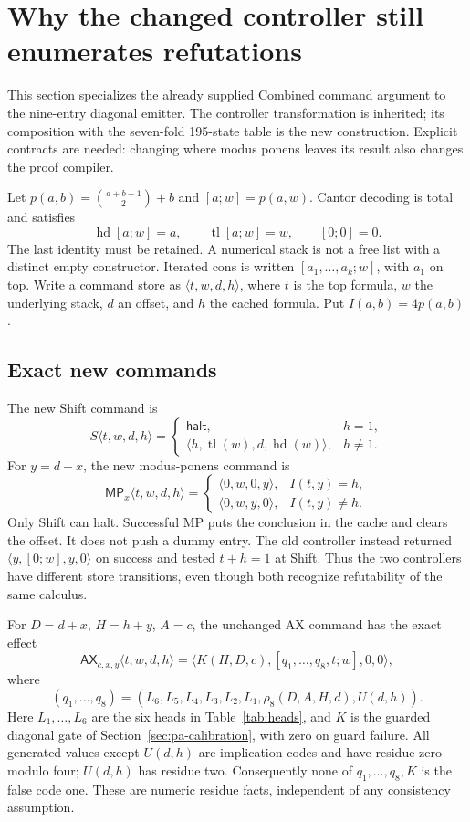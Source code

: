 \section{Why the changed controller still enumerates refutations}
\label{sec:commands}

This section specializes the already supplied Combined command argument
\cite{combined,cross,new195} to the nine-entry diagonal emitter. The
controller transformation is inherited; its composition with the seven-fold
195-state table is the new construction. Explicit contracts are needed:
changing where modus ponens leaves its result also changes the proof compiler.

Let $p(a,b)=\binom{a+b+1}{2}+b$ and $[a;w]=p(a,w)$. Cantor decoding is
total and satisfies
\[
 \operatorname{hd}[a;w]=a,\qquad
 \operatorname{tl}[a;w]=w,\qquad [0;0]=0.
\]
The last identity must be retained. A numerical stack is not a free list
with a distinct empty constructor. Iterated cons is written
$[a_1,\ldots,a_k;w]$, with $a_1$ on top. Write a command store as
$\langle t,w,d,h\rangle$, where $t$ is the top formula, $w$ the underlying
stack, $d$ an offset, and $h$ the cached formula. Put $I(a,b)=4p(a,b)$.

\subsection{Exact new commands}

The new Shift command is
\[
 S\langle t,w,d,h\rangle=
 \begin{cases}
  \mathsf{halt},&h=1,\\
  \langle h,\operatorname{tl}(w),d,\operatorname{hd}(w)\rangle,&h\ne1.
 \end{cases}
\]
For $y=d+x$, the new modus-ponens command is
\[
 \mathsf{MP}_x\langle t,w,d,h\rangle=
 \begin{cases}
  \langle0,w,0,y\rangle,&I(t,y)=h,\\
  \langle0,w,y,0\rangle,&I(t,y)\ne h.
 \end{cases}                                                    \tag{C1}
\]
Only Shift can halt. Successful MP puts the conclusion in the cache and
clears the offset. It does not push a dummy entry. The old controller
instead returned $\langle y,[0;w],y,0\rangle$ on success and tested
$t+h=1$ at Shift. Thus the two controllers have different store transitions,
even though both recognize refutability of the same calculus.

For $D=d+x$, $H=h+y$, $A=c$, the unchanged AX command has the exact effect
\[
 \mathsf{AX}_{c,x,y}\langle t,w,d,h\rangle
 =\langle K(H,D,c),[q_1,\ldots,q_8,t;w],0,0\rangle,               \tag{C2}
\]
where
\[
 (q_1,\ldots,q_8)
 =(L_6,L_5,L_4,L_3,L_2,L_1,\rho_8(D,A,H,d),U(d,h)).
\]
Here $L_1,\ldots,L_6$ are the six heads in Table~\ref{tab:heads}, and $K$
is the guarded diagonal gate of Section~\ref{sec:pa-calibration}, with zero
on guard failure. All generated values except $U(d,h)$ are implication
codes and have residue zero modulo four; $U(d,h)$ has residue two.
Consequently none of $q_1,\ldots,q_8,K$ is the false code one. These are
numeric residue facts, independent of any consistency assumption.

